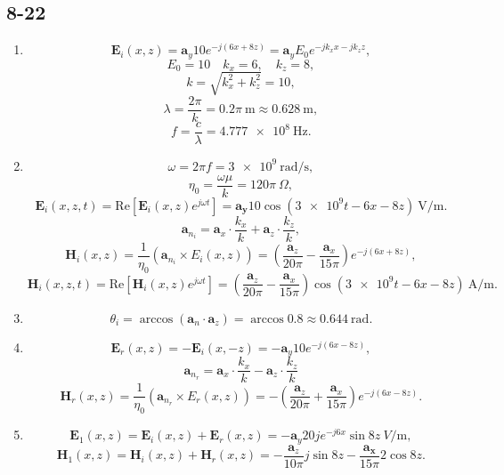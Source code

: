 \documentclass[11pt,a4paper]{article}
\author{\href{liuyh615@sjtu.edu.cn}{Yihao Liu} (515370910207)}
\subtitle{Homework}
\begin{document}
\maketitle

\subsection{8-22}

\begin{enumerate}[label=\alph*)]
\item
$$\mathbf{E}_i(x,z)=\mathbf{a}_y10e^{-j(6x+8z)}=\mathbf{a}_yE_0e^{-jk_xx-jk_zz},$$
$$E_0=10\quad k_x=6,\quad k_z=8,$$
$$k=\sqrt{k_x^2+k_z^2}=10,$$
$$\lambda=\frac{2\pi}{k}=0.2\pi~\si{\m}\approx\SI{0.628}{\m},$$
$$f=\frac{c}{\lambda}=\SI{4.777e8}{\Hz}.$$
\item
$$\omega=2\pi f=\SI{3e9}{\radian\per\s},$$
$$\eta_0=\frac{\omega\mu}{k}=120\pi~\Omega,$$
$$\mathbf{E}_i(x,z,t)=\text{Re}[\mathbf{E}_i(x,z)e^{j\omega t}]=\mathbf{a_y}10\cos(\num{3e9}t-6x-8z)~\si{\V\per\m}.$$
$$\mathbf{a}_{n_i}=\mathbf{a}_x\cdot\frac{k_x}{k}+\mathbf{a}_z\cdot\frac{k_z}{k},$$
$$\mathbf{H}_i(x,z)=\frac{1}{\eta_0}(\mathbf{a}_{n_i}\times E_i(x,z))=\left(\frac{\mathbf{a}_z}{20\pi}-\frac{\mathbf{a}_x}{15\pi}\right)e^{-j(6x+8z)},$$
$$\mathbf{H}_i(x,z,t)=\text{Re}[\mathbf{H}_i(x,z)e^{j\omega t}]=\left(\frac{\mathbf{a}_z}{20\pi}-\frac{\mathbf{a}_x}{15\pi}\right)\cos(\num{3e9}t-6x-8z)~\si{\A\per\m}.$$
\item
$$\theta_i=\arccos(\mathbf{a}_n\cdot\mathbf{a}_z)=\arccos0.8\approx0.644~\si{\radian}.$$
\item
$$\mathbf{E}_r(x,z)=-\mathbf{E}_i(x,-z)=-\mathbf{a}_y10e^{-j(6x-8z)},$$
$$\mathbf{a}_{n_r}=\mathbf{a}_x\cdot\frac{k_x}{k}-\mathbf{a}_z\cdot\frac{k_z}{k}$$
$$\mathbf{H}_r(x,z)=\frac{1}{\eta_0}(\mathbf{a}_{n_r}\times E_r(x,z))=-\left(\frac{\mathbf{a}_z}{20\pi}+\frac{\mathbf{a}_x}{15\pi}\right)e^{-j(6x-8z)}.$$
\item
$$\mathbf{E}_1(x,z)=\mathbf{E}_i(x,z)+\mathbf{E}_r(x,z)=-\mathbf{a}_y20je^{-j6x}\sin8z~\si{V\per\m},$$
$$\mathbf{H}_1(x,z)=\mathbf{H}_i(x,z)+\mathbf{H}_r(x,z)=-\frac{\mathbf{a}_z}{10\pi}j\sin8z-\frac{\mathbf{a_x}}{15\pi}2\cos8z.$$
\end{enumerate}
\end{document}
